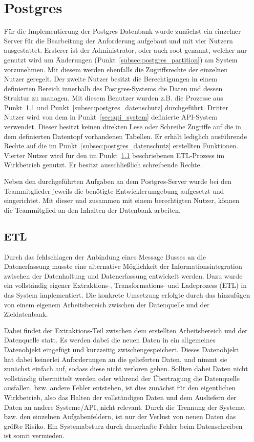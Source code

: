 \section{Postgres}
Für die Implementierung der Postgres Datenbank wurde zunächst ein einzelner
Server für die Bearbeitung der Anforderung aufgebaut und mit vier Nutzern
ausgestattet. Ersterer ist der Administrator, oder auch root genannt, welcher
nur genutzt wird um Änderungen (Punkt~\ref{subsec:postgres_partition}) am
System vorzunehmen. Mit diesem werden ebenfalls die Zugriffsrechte der
einzelnen Nutzer geregelt. Der zweite Nutzer besitzt die Berechtigungen in
einem definierten Bereich innerhalb des Postgres-Systems die
Daten und dessen Struktur zu managen. Mit diesem Benutzer wurden z.B. die
Prozesse aus Punkt~\ref{subsec:postgres_etl} und
Punkt~\ref{subsec:postgres_datenschutz} durchgeführt. Dritter Nutzer wird
von dem in Punkt~\ref{sec:api_system} definierte API-System verwendet. Dieser
besitzt keinen direkten Lese oder Schreibe Zugriffe auf die in dem definierten
Datentopf vorhandenen Tabellen. Er erhält lediglich ausführende Rechte auf die
im Punkt~\ref{subsec:postgres_datenschutz} erstellten Funktionen. Vierter
Nutzer wird für den im Punkt~\ref{subsec:postgres_etl} beschriebenen ETL-Prozess
im Wirkbetrieb genutzt. Er besitzt ausschließlich schreibende Rechte.

Neben den durchgeführten Aufgaben an dem Postgres-Server wurde bei
den Teammitglieder jeweils die benötigte Entwicklerumgebung aufgesetzt
und eingerichtet. Mit dieser und zusammen mit einem berechtigten Nutzer,
können die Teammitglied an den Inhalten der Datenbank arbeiten. 
\nl%

\subsection{ETL}
\label{subsec:postgres_etl}
Durch das fehlschlagen der Anbindung eines Message Busses an die Datenerfassung
musste eine alternative Möglichkeit der Informationsintegration zwischen der
Datenhaltung und Datenerfassung entwickelt werden. Dazu wurde ein vollständig
eigener Extraktions-, Transformations- und Ladeprozess (ETL) in das System
implementiert. Die konkrete Umsetzung erfolgte durch das hinzufügen von einem
eigenem Arbeitsbereich zwischen der Datenquelle und der Zieldatenbank.

Dabei findet der Extraktions-Teil zwischen dem erstellten Arbeitsbereich und
der Datenquelle statt. Es werden dabei die neuen Daten in ein allgemeines
Datenobjekt eingefügt und kurzzeitig zwischengespeichert. Dieses Datenobjekt
hat dabei keinerlei Anforderungen an die gelieferten Daten, und nimmt sie
zunächst einfach auf, sodass diese nicht verloren gehen. Sollten dabei
Daten nicht vollständig übermittelt werden oder während der Übertragung die
Datenquelle ausfallen, bzw. andere Fehler entstehen, ist dies zunächst für den
eigentlichen Wirkbetrieb, also das Halten der vollständigen Daten und dem
Ausliefern der Daten an andere Systeme/API, nicht relevant. Durch die Trennung
der Systeme, bzw. den einzelnen Aufgabenfeldern, ist nur der Verlust von neuen
Daten das größte Risiko. Ein Systemabsturz durch dauerhafte Fehler beim
Datenschreiben ist somit vermieden.

